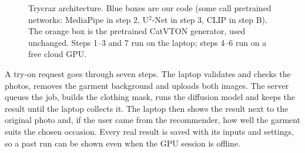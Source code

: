 \documentclass{article}
\newcommand{\unet}{U$^2$-Net}
\begin{document}
\begin{figure}[t]
{}
\caption{Trycraz architecture. Blue boxes are our code (some call pretrained networks: MediaPipe in step 2,
\unet{} in step 3, CLIP in step B). The orange box is the pretrained CatVTON generator, used unchanged.
Steps 1--3 and 7 run on the laptop; steps 4--6 run on a free cloud GPU.}
\label{fig:arch}
\end{figure}

A try-on request goes through seven steps. The laptop validates and checks the photos, removes the
garment background and uploads both images. The server queues the job, builds the clothing mask, runs
the diffusion model and keeps the result until the laptop collects it. The laptop then shows the
result next to the original photo and, if the user came from the recommender, how well the garment
suits the chosen occasion. Every real result is saved with its inputs and settings, so a past run can
be shown even when the GPU session is offline.
\end{document}
